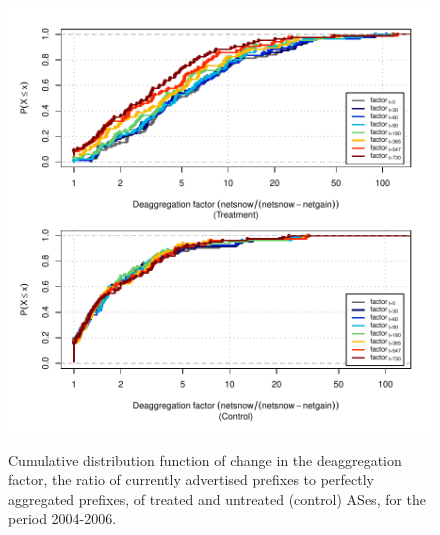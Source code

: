 \clearpage
\vspace*{16pt}
\begin{figure}[H]
\begin{centering}
\begin{singlespace}
\captionsetup{list=no}
    \includegraphics[width=6in]
    {figures/behavior-deagg_factor-2004_2006-corr.pdf}
    \vspace{-2em}\\
    \caption{Cumulative distribution function of change in the deaggregation
    factor, the ratio of currently advertised prefixes to perfectly aggregated
    prefixes, of treated and untreated (control) ASes, for the period
    2004-2006.}
\end{singlespace}
\end{centering}
\end{figure}

